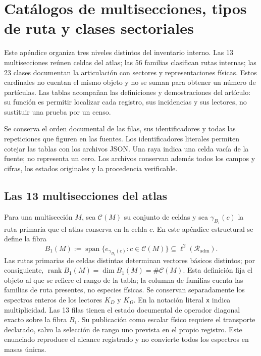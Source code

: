 \clearpage
\section{Catálogos de multisecciones, tipos de ruta y clases sectoriales}
\label{vi:sec:vi-catalogos-estructurales}

Este apéndice organiza tres niveles distintos del inventario interno. Las
13 multisecciones reúnen celdas del atlas; las 56 familias clasifican rutas
internas; las 23 clases documentan la articulación con sectores y
representaciones físicas. Estos cardinales no cuentan el mismo objeto y
no se suman para obtener un número de partículas. Las tablas acompañan las
definiciones y demostraciones del artículo: su función es permitir localizar
cada registro, sus incidencias y sus lectores, no sustituir una prueba por un censo.

Se conserva el orden documental de las filas, sus identificadores y todas
las repeticiones que figuren en las fuentes. Los identificadores literales
permiten cotejar las tablas con los archivos JSON. Una raya indica una celda
vacía de la fuente; no representa un cero. Los archivos conservan además todos
los campos y cifras, los estados originales y la procedencia verificable.
\CatalogRouteReference

\subsection{Las 13 multisecciones del atlas}

Para una multisección \(M\), sea \(\mathcal C(M)\) su conjunto de celdas y
sea \(\gamma_{B_1}(c)\) la ruta primaria que el atlas conserva en la celda
\(c\). En este apéndice estructural se define la fibra
\[
 B_1(M):=
 \operatorname{span}\bigl\{e_{\gamma_{B_1}(c)}:c\in\mathcal C(M)\bigr\}
 \subseteq \ell^2(\mathcal R_{\mathrm{adm}}).
\]
Las rutas primarias de celdas distintas determinan vectores básicos distintos;
por consiguiente,
\(\operatorname{rank}B_1(M)=\dim B_1(M)=\#\mathcal C(M)\).
Esta definición fija el objeto al que se refiere el rango de la tabla; la
columna de familias cuenta las
familias de ruta presentes, no especies físicas. Se conservan separadamente
los espectros enteros de los lectores \(K_D\) y \(K_\Omega\).
En la notación literal \texttt{x} indica multiplicidad. Las 13 filas tienen
el estado documental de operador diagonal exacto sobre la fibra \(B_1\).
Su publicación como escalar físico requiere el transporte declarado, salvo
la selección de rango uno prevista en el propio registro. Este enunciado
reproduce el alcance registrado y no convierte todos los espectros en masas únicas.

